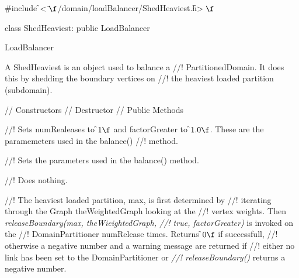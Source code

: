
\indent \#include \f$<\tilde{ }\f$/domain/loadBalancer/ShedHeaviest.h\f$>\f$

\indent class ShedHeaviest: public LoadBalancer

\indent  LoadBalancer
\indent{}


\indent A ShedHeaviest is an object used to balance a
//! PartitionedDomain. It does this by shedding the boundary vertices on
//! the heaviest loaded partition (subdomain).

\indent\indent  // Constructors
\indent{} 
\indent{}
\indent\indent // Destructor
\indent{}
\indent\indent // Public Methods
\indent{}


//! Sets \p numRealeases to \f$1\f$ and  \p factorGreater to
\f$1.0\f$. These are the paramemeters used in the balance()
//! method. 

//! Sets the parameters used in the balance() method.

//! Does nothing.

//! The heaviest loaded partition, \p max, is first determined by
//! iterating through the Graph \p theWeightedGraph looking at the
//! vertex weights. Then {\em releaseBoundary(max, theWieightedGraph,
//! true, factorGreater)} is invoked on the
//! DomainPartitioner \p numRelease times. Returns \f$0\f$ if successfull,
//! otherwise a negative number and a warning message are returned if
//! either no link has been set to the DomainPartitioner or {\em
//! releaseBoundary()} returns a negative number.



